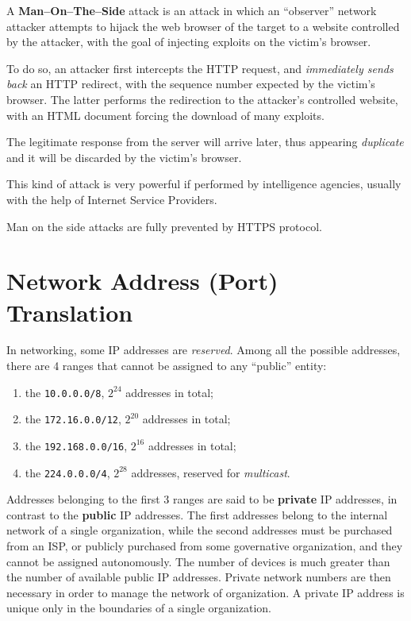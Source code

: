 \documentclass[10pt]{extreport}
\begin{document}
A \textbf{Man--On--The--Side} attack is an attack in which an ``observer''
network attacker attempts to hijack the web browser of the target to a website
controlled by the attacker, with the goal of injecting exploits on the victim's
browser.

To do so, an attacker first intercepts the HTTP request, and \emph{immediately
sends back} an HTTP redirect, with the sequence number expected by the victim's
browser. The latter performs the redirection to the attacker's controlled
website, with an HTML document forcing the download of many exploits.

The legitimate response from the server will arrive later, thus appearing
\emph{duplicate} and it will be discarded by the victim's browser.

This kind of attack is very powerful if performed by intelligence agencies,
usually with the help of Internet Service Providers.

Man on the side attacks are fully prevented by HTTPS protocol.

\chapter{Network Address (Port) Translation}

In networking, some IP addresses are \emph{reserved}. Among all the possible
addresses, there are 4 ranges that cannot be assigned to any ``public'' entity:
\begin{enumerate}
    \item the \texttt{10.0.0.0/8}, $2^{24}$ addresses in total;
    \item the \texttt{172.16.0.0/12}, $2^{20}$ addresses in total; 
    \item the \texttt{192.168.0.0/16}, $2^{16}$ addresses in total; 
    \item the \texttt{224.0.0.0/4}, $2^{28}$ addresses, reserved for
        \emph{multicast}.
\end{enumerate}

Addresses belonging to the first 3 ranges are said to be \textbf{private} IP
addresses, in contrast to the \textbf{public} IP addresses. The first addresses
belong to the internal network of a single organization, while the second
addresses must be purchased from an ISP, or publicly purchased from some
governative organization, and they cannot be assigned autonomously. The number
of devices is much greater than the number of available public IP addresses.
Private network numbers are then necessary in order to manage the network of
organization. A private IP address is unique only in the boundaries of a single
organization.
\end{document}
